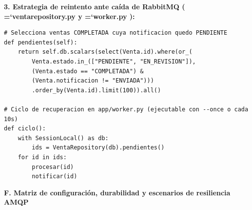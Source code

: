 \documentclass[11pt,a4paper]{article}
\renewcommand{\_}{\oldunderscore\allowbreak}
\DeclareRobustCommand{\texttt}[1]{%
  {\upshape\ttfamily\fontsize{9}{10.8}\selectfont\hyphenchar\font=`\-\relax #1}%
}
\begin{document}
\vspace{0.1cm}
\noindent\textbf{3. Estrategia de reintento ante caída de RabbitMQ (\texttt{venta\_repository.\allowbreak{}py} y \texttt{worker.py}):}
\begin{lstlisting}
# Selecciona ventas COMPLETADA cuya notificacion quedo PENDIENTE
def pendientes(self):
    return self.db.scalars(select(Venta.id).where(or_(
        Venta.estado.in_(["PENDIENTE", "EN_REVISION"]),
        (Venta.estado == "COMPLETADA") &
        (Venta.notificacion != "ENVIADA")))
        .order_by(Venta.id).limit(100)).all()

# Ciclo de recuperacion en app/worker.py (ejecutable con --once o cada 10s)
def ciclo():
    with SessionLocal() as db:
        ids = VentaRepository(db).pendientes()
    for id in ids:
        procesar(id)
        notificar(id)
\end{lstlisting}

\vspace{0.2cm}
\noindent\textbf{F. Matriz de configuración, durabilidad y escenarios de resiliencia AMQP}
\end{document}
